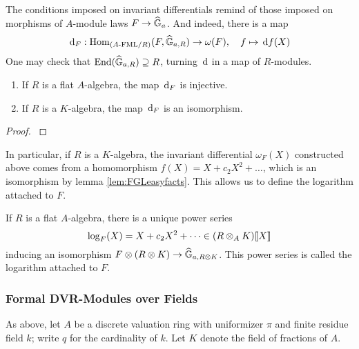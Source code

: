 The conditions imposed on invariant differentials remind of those imposed on 
morphisms of $A$-module laws $F \to \widehat{\mathbb{G}}_a$. And indeed, there is a map
\begin{equation} \label{eq:functorinvdifftohom}
  \, \mathrm{d}_F : \operatorname{Hom}_{{({A}\text-\mathrm{FML}/{R})}} (F, \widehat{\mathbb{G}}_{a,R}) \to \omega(F), \quad f \mapsto \, \mathrm{d} f(X)
\end{equation}
One may check that $\operatorname{End}(\widehat{\mathbb{G}}_{a,R}) \supseteq R$, turning $\, \mathrm{d}$ in a map of $R$-modules.
\begin{prop}
  \begin{enumerate}
    \item If $R$ is a flat $A$-algebra, the map $\, \mathrm{d}_F$ is injective.
    \item If $R$ is a $K$-algebra, the map $\, \mathrm{d}_F$ is an isomorphism.
  \end{enumerate}
\begin{proof}
  \cite[Chapter 3]{hopkins1994equivariant} 
\end{proof}
\end{prop}
In particular, if $R$ is a $K$-algebra, the invariant differential 
$\omega_F(X)$ constructed above comes from a homomorphism $f(X) = X + c_2 X^2 + \dots$,
which is an isomorphism by lemma \ref{lem:FGLeasyfacts}. 
This allows us to define the logarithm attached to $F$.
\begin{defi}[Logarithm]
  If $R$ is a flat $A$-algebra, there is a unique power series
  \begin{equation*}
    \log_F(X) = X + c_2 X^2 + \dots \in (R \otimes_A K)\llbracket X \rrbracket 
  \end{equation*}
  inducing an isomorphism $F \otimes (R \otimes K) \to \widehat{\mathbb{G}}_{a,R\otimes K}$.
  This power series is called the logarithm attached to $F$. 
\end{defi}

\subsubsection{Formal DVR-Modules over Fields} %
\label{ssub:Formal DVR-Modules over Fields}
As above, let $A$ be a discrete valuation ring with uniformizer $\pi$ and finite 
residue field $k$; write $q$ for the cardinality of $k$. Let $K$ denote the
field of fractions of $A$.

